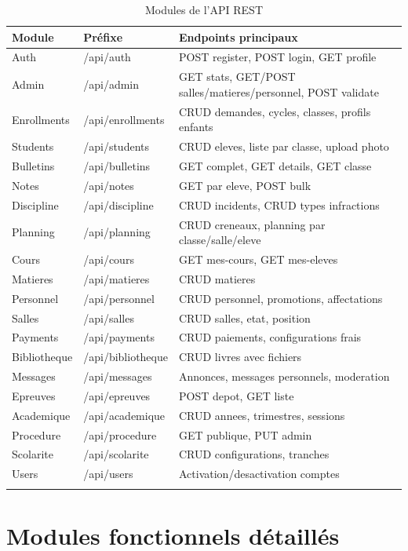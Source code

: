 \documentclass[12pt, a4paper]{report}
\begin{document}
\begin{longtable}{|p{2.5cm}|p{3cm}|p{8cm}|}
\hline
\textbf{Module} & \textbf{Préfixe} & \textbf{Endpoints principaux} \\
\hline
\endhead
\hline
\endfoot
Auth & /api/auth & POST register, POST login, GET profile \\
Admin & /api/admin & GET stats, GET/POST salles/matieres/personnel, POST validate \\
Enrollments & /api/enrollments & CRUD demandes, cycles, classes, profils enfants \\
Students & /api/students & CRUD eleves, liste par classe, upload photo \\
Bulletins & /api/bulletins & GET complet, GET details, GET classe \\
Notes & /api/notes & GET par eleve, POST bulk \\
Discipline & /api/discipline & CRUD incidents, CRUD types infractions \\
Planning & /api/planning & CRUD creneaux, planning par classe/salle/eleve \\
Cours & /api/cours & GET mes-cours, GET mes-eleves \\
Matieres & /api/matieres & CRUD matieres \\
Personnel & /api/personnel & CRUD personnel, promotions, affectations \\
Salles & /api/salles & CRUD salles, etat, position \\
Payments & /api/payments & CRUD paiements, configurations frais \\
Bibliotheque & /api/bibliotheque & CRUD livres avec fichiers \\
Messages & /api/messages & Annonces, messages personnels, moderation \\
Epreuves & /api/epreuves & POST depot, GET liste \\
Academique & /api/academique & CRUD annees, trimestres, sessions \\
Procedure & /api/procedure & GET publique, PUT admin \\
Scolarite & /api/scolarite & CRUD configurations, tranches \\
Users & /api/users & Activation/desactivation comptes \\
\hline
\caption{Modules de l'API REST}
\label{tab:api_modules}
\end{longtable}

\section{Modules fonctionnels détaillés}
\end{document}
